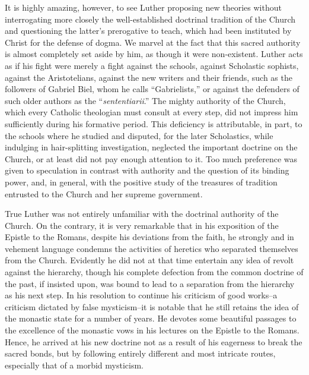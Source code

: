 It is highly amazing, however, to see Luther proposing new theories
without interrogating more closely the well-established doctrinal
tradition of the Church and questioning the latter’s prerogative to
teach, which had been instituted by Christ for the defense of dogma.
We marvel at the fact that this sacred authority is almost completely
set aside by him, as though it were non-existent. Luther acts
as if his fight were merely a fight against the schools, against Scholastic
sophists, against the Aristotelians, against the new writers and
their friends, such as the followers of Gabriel Biel, whom he calls
“Gabrielists,” or against the defenders of such older authors as the
“\textit{sententiarii}.” The mighty authority of the Church, which every
Catholic theologian must consult at every step, did not impress
him sufficiently during his formative period. This deficiency is attributable,
in part, to the schools where he studied and disputed,
for the later Scholastics, while indulging in hair-splitting investigation,
neglected the important doctrine on the Church, or at least did
not pay enough attention to it. Too much preference was given to
speculation in contrast with authority and the question of its binding
power, and, in general, with the positive study of the treasures
of tradition entrusted to the Church and her supreme government.

True Luther was not entirely unfamiliar with the doctrinal authority of
the Church. On the contrary, it is very remarkable that
in his exposition of the Epistle to the Romans, despite his deviations
from the faith, he strongly and in vehement language condemns
the activities of heretics who separated themselves from the
Church. Evidently he did not at that time entertain any idea of
revolt against the hierarchy, though his complete defection from
the common doctrine of the past, if insisted upon, was bound to lead
to a separation from the hierarchy as his next step.
In his resolution to continue his criticism of good works--a
criticism dictated by false mysticism--it is notable that he still retains
the idea of the monastic state for a number of years. He devotes some beautiful
passages to the excellence of the monastic vows
in his lectures on the Epistle to the Romans. Hence, he arrived at his
new doctrine not as a result of his eagerness to break the sacred bonds,
but by following entirely different and most intricate routes, especially
that of a morbid mysticism.
